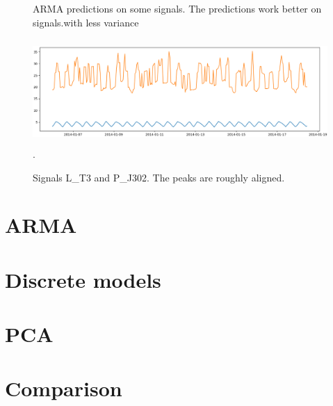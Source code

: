 \documentclass[]{article}
\begin{document}
\begin{figure}[H]
\begin{minipage}{.5\textwidth}
   \caption{ARMA predictions on some signals. The predictions work better on signals.with less variance}
  \label{predictions}
\end{minipage}
\begin{minipage}{.5\textwidth}
  \includegraphics[width=2\linewidth, height=4cm]{./visuallizations/correlated_signals.png}.
  \label{correlation}
  \caption{Signals L\_T3 and P\_J302. The peaks are roughly aligned.}
\end{minipage}%
\end{figure}

\section{ARMA}
\section{Discrete models}
\section{PCA}
\section{Comparison} 
\end{document}
